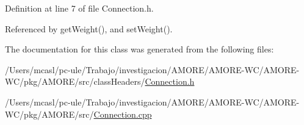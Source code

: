 Definition at line 7 of file Connection.h.



Referenced by getWeight(), and setWeight().



The documentation for this class was generated from the following files:\begin{DoxyCompactItemize}
\item 
/Users/mcasl/pc-\/ule/Trabajo/investigacion/AMORE/AMORE-\/WC/AMORE-\/WC/pkg/AMORE/src/classHeaders/\hyperlink{_connection_8h}{Connection.h}\item 
/Users/mcasl/pc-\/ule/Trabajo/investigacion/AMORE/AMORE-\/WC/AMORE-\/WC/pkg/AMORE/src/\hyperlink{_connection_8cpp}{Connection.cpp}\end{DoxyCompactItemize}
